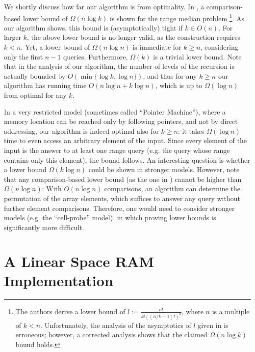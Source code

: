 \documentclass[a4paper,10pt]{article}
\begin{document}
We shortly discuss how far our algorithm is from optimality.
In \cite{DBLP:conf/esa/Har-PeledM08}, 
a comparison-based lower bound of $\Omega(n \log k)$ is shown for the range median problem 
\footnote{The authors derive a lower bound of $l :=\frac{n!}{k!((n/k-1)!)^k}$, where $n$ is a multiple of $k<n$. Unfortunately, the analysis of the asymptotics of $l$ given in \cite{DBLP:conf/esa/Har-PeledM08} is erroneous; however, a corrected analysis shows that the claimed $\Omega(n\log k)$ bound holds.}. 
As our algorithm shows, this bound is (asymptotically) tight if $k \in O(n)$.
For larger $k$, the above lower bound is no longer valid, as the construction requires $k<n$. 
Yet, a lower bound of $\Omega(n\log n)$ is immediate for $k\geq n$, considering only the first $n-1$ queries.
Furthermore, $\Omega(k)$ is a trivial lower bound.
Note that in the analysis of our algorithm, the number of levels of the recursion is
actually bounded by $O(\min \{\log k, \log n \})$, and 
thus
for any $k\geq n$ our algorithm has running time $O(n\log n + k\log n)$,
which is up to $\Omega(\log n)$ from optimal for any $k$.

In a very restricted model (sometimes called ``Pointer Machine''), where a memory location can be reached only by following pointers, and not by direct addressing, 
our algorithm is indeed optimal also for $k \geq n$: it takes $\Omega(\log n)$ time to even access an arbitrary element of the input.
Since every element of the input is the answer to at least one range query (e.g. the query whose range contains only this element), the bound follows.
An interesting question is whether a lower bound $\Omega(k\log n)$ could be shown in stronger models. However, note that any comparison-based lower bound (as the one in  \cite{DBLP:conf/esa/Har-PeledM08}) cannot be higher than $\Omega(n\log n)$: With $O(n\log n)$ comparisons, an algorithm can determine the permutation of the array elements, which suffices to answer any query without further element comparisons.
Therefore, one would need to consider stronger models (e.g. the ``cell-probe'' model), in which proving
lower bounds is significantly more difficult.








\section{A Linear Space RAM Implementation}\label{s:RAM}
\end{document}
